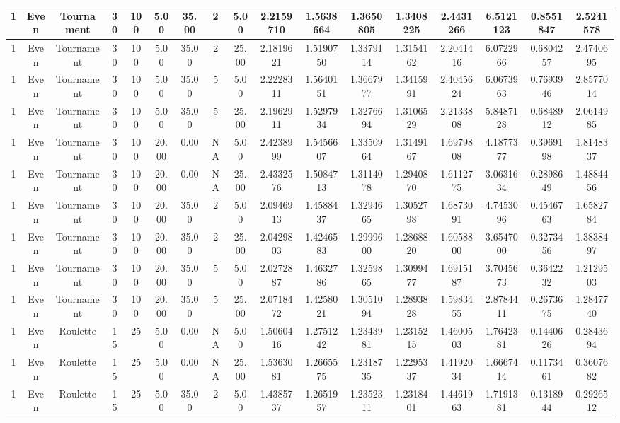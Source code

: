 \documentclass[a4paper]{article}
\begin{document}
\begin{center}
\begin{tabular}{ | c | c | c | c | c | c | c | c | c | c | c | c | c | c | c | c | c | }
		\hline
		1	&	Even	&	Tournament	&	30	&	100	&	5.00	&	35.00	&	2	&	5.00	&	2.2159710	&	1.5638664	&	1.3650805	&	1.3408225	&	2.4431266	&	6.5121123	&	0.8551847	&	2.5241578 \\
		\hline
		1	&	Even	&	Tournament	&	30	&	100	&	5.00	&	35.00	&	2	&	25.00	&	2.1819621	&	1.5190750	&	1.3379114	&	1.3154162	&	2.2041416	&	6.0722966	&	0.6804257	&	2.4740695 \\
		\hline
		1	&	Even	&	Tournament	&	30	&	100	&	5.00	&	35.00	&	5	&	5.00	&	2.2228311	&	1.5640151	&	1.3667977	&	1.3415991	&	2.4045624	&	6.0673963	&	0.7693946	&	2.8577014 \\
		\hline
		1	&	Even	&	Tournament	&	30	&	100	&	5.00	&	35.00	&	5	&	25.00	&	2.1962911	&	1.5297934	&	1.3276694	&	1.3106529	&	2.2133808	&	5.8487128	&	0.6848912	&	2.0614985 \\
		\hline
		1	&	Even	&	Tournament	&	30	&	100	&	20.00	&	0.00	&	NA	&	5.00	&	2.4238999	&	1.5456607	&	1.3350964	&	1.3149167	&	1.6979808	&	4.1877377	&	0.3969198	&	1.8148337 \\
		\hline
		1	&	Even	&	Tournament	&	30	&	100	&	20.00	&	0.00	&	NA	&	25.00	&	2.4332576	&	1.5084713	&	1.3114078	&	1.2940870	&	1.6112775	&	3.0631634	&	0.2898649	&	1.4884456 \\
		\hline
		1	&	Even	&	Tournament	&	30	&	100	&	20.00	&	35.00	&	2	&	5.00	&	2.0946913	&	1.4588437	&	1.3294665	&	1.3052798	&	1.6873091	&	4.7453096	&	0.4546763	&	1.6582784 \\
		\hline
		1	&	Even	&	Tournament	&	30	&	100	&	20.00	&	35.00	&	2	&	25.00	&	2.0429803	&	1.4246583	&	1.2999600	&	1.2868820	&	1.6058800	&	3.6547000	&	0.3273456	&	1.3838497 \\
		\hline
		1	&	Even	&	Tournament	&	30	&	100	&	20.00	&	35.00	&	5	&	5.00	&	2.0272887	&	1.4632786	&	1.3259865	&	1.3099477	&	1.6915187	&	3.7045673	&	0.3642232	&	1.2129503 \\
		\hline
		1	&	Even	&	Tournament	&	30	&	100	&	20.00	&	35.00	&	5	&	25.00	&	2.0718472	&	1.4258021	&	1.3051094	&	1.2893828	&	1.5983455	&	2.8784411	&	0.2673675	&	1.2847740 \\
		\hline
		1	&	Even	&	Roulette	&	15	&	25	&	5.00	&	0.00	&	NA	&	5.00	&	1.5060416	&	1.2751242	&	1.2343981	&	1.2315215	&	1.4600503	&	1.7642381	&	0.1440626	&	0.2843694 \\
		\hline
		1	&	Even	&	Roulette	&	15	&	25	&	5.00	&	0.00	&	NA	&	25.00	&	1.5363081	&	1.2665575	&	1.2318735	&	1.2295337	&	1.4192034	&	1.6667414	&	0.1173461	&	0.3607682 \\
		\hline
		1	&	Even	&	Roulette	&	15	&	25	&	5.00	&	35.00	&	2	&	5.00	&	1.4385737	&	1.2651957	&	1.2352311	&	1.2318401	&	1.4461963	&	1.7191381	&	0.1318944	&	0.2926512 \\

\end{tabular}
\end{center}
\end{document}
